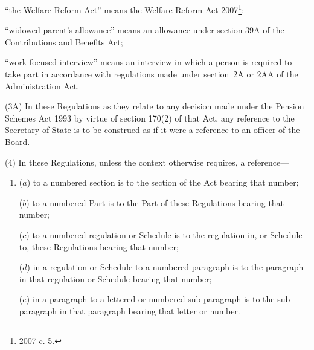 \documentclass[12pt,a4paper]{article}
\begin{document}
\begin{enumerate}
“the Welfare Reform Act” means the Welfare Reform Act 2007\footnote{2007 c. 5.};

“widowed parent’s allowance” means an allowance under section 39A of the Contributions and Benefits Act;



“work-focused interview” means an interview in which a person is required to take part in accordance with regulations made under section~2A or 2AA of the Administration Act.

\end{enumerate}

(3A) In these Regulations as they relate to any decision made under the Pension Schemes Act 1993 by virtue of section 170(2) of that Act, any reference to the Secretary of State is to be construed as if it were a reference to an officer of the Board.

(4) In these Regulations, unless the context otherwise requires, a reference—
\begin{enumerate}\item[]
($a$) to a numbered section is to the section of the Act bearing that number;

($b$) to a numbered Part is to the Part of these Regulations bearing that number;

($c$) to a numbered regulation or Schedule is to the regulation in, or Schedule to, these Regulations bearing that number;

($d$) in a regulation or Schedule to a numbered paragraph is to the paragraph in that regulation or Schedule bearing that number;

($e$) in a paragraph to a lettered or numbered sub-paragraph is to the sub-paragraph in that paragraph bearing that letter or number.
\end{enumerate}
\end{document}
